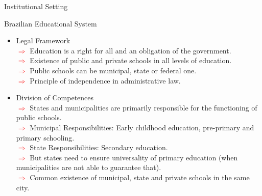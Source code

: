\documentclass{beamer}
\begin{document}
\begin{frame}[label=Main1]{Institutional Setting}
\begin{block}{\centering \Large Brazilian Educational System}
\begin{itemize}
\item \normalsize Legal Framework
\\ \tiny\textcolor{red}{$\Longrightarrow$} Education is a right for all and an obligation of the government.
\\ \tiny\textcolor{red}{$\Longrightarrow$} Existence of public and private schools in all levels of education.
\\ \tiny\textcolor{red}{$\Longrightarrow$} Public schools can be municipal, state or federal one.
\\ \tiny\textcolor{red}{$\Longrightarrow$} Principle of independence in administrative law.

\item \normalsize Division of Competences
\\ \tiny\textcolor{red}{$\Longrightarrow$} States and municipalities are primarily responsible for the functioning of public schools.
\\ \tiny\textcolor{red}{$\Longrightarrow$} Municipal Responsibilities: Early childhood education, pre-primary and primary schooling.
\\ \tiny\textcolor{red}{$\Longrightarrow$} State Responsibilities: Secondary education.
\\ \tiny\textcolor{red}{$\Longrightarrow$} But states need to ensure universality of primary education (when municipalities are not able to guarantee that).
\\ \tiny\textcolor{red}{$\Longrightarrow$} Common existence of municipal, state and private schools in the same city.
\end{itemize}
\end{block}



\end{frame}
\end{document}
